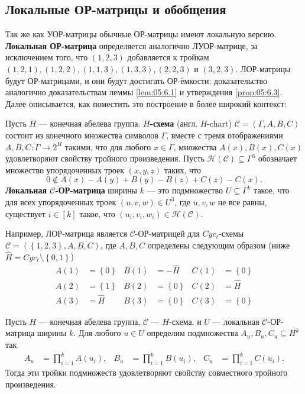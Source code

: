 \subsection{Локальные ОР-матрицы и обобщения}\label{ssub:05:6.3}

Так же как УОР-матрицы обычные ОР-матрицы имеют локальную версию. \textbf{Локальная ОР-матрица} определяется аналогично ЛУОР-матрице, за исключением того, что $(1,2,3)$ добавляется к тройкам $(1,2,1), (1,2,2), (1,1,3), (1,3,3), (2,2,3)$ и $(3,2,3)$. ЛОР-матрицы будут ОР-матрицами, и они будут достигать ОР-ёмкости: доказательство аналогично доказательствам леммы \ref{lem:05:6.1} и утверждения \ref{prop:05:6.3}. Далее описывается, как поместить это построение в более широкий контекст:

\begin{definition}
  \label{def:05:6.5} Пусть $H$ --- конечная абелева группа. \textbf{$H$-схема} (англ. $H$-chart) $\mathcal{C}=(\Gamma, A,B,C)$ состоит из конечного множества символов $\Gamma$, вместе с тремя отображениями $A,B,C: \Gamma \to 2^H$ такими, что для любого $x \in \Gamma$, множества $A(x), B(x), C(x)$ удовлетворяют свойству тройного произведения. Пусть $\mathcal{H}(\mathcal{C}) \subseteq \Gamma^3$ обозначает множество упорядоченных троек $(x,y,z)$ таких, что 
  \[
  	0 \notin A(x) - A(y) + B(y) - B(z) + C(z) - C(x).
  \]
\textbf{Локальная $\mathcal{C}$-ОР-матрица} ширины $k$ --- это подмножество $U \subseteq \Gamma^k$ такое, что для всех упорядоченных троек $(u,v,w) \in U^3$, где $u,v,w$ не все равны, существует $i \in [k]$ такое, что $(u_i, v_i, w_i) \in \mathcal{H}(\mathcal{C})$.
\end{definition}

Например, ЛОР-матрица является $\mathcal{C}$-ОР-матрицей для $Cyc_\ell$-схемы $\mathcal{C}=(\left\{ 1,2,3 \right\}, A, B, C)$, где $A, B, C$ определены следующим образом (ниже $\widehat{H} = Cyc_\ell \setminus \left\{ 0,1 \right\}$)
\begin{align*}
  	A(1) & = \left\{ 0 \right\} & B(1) & = -\widehat{H} & C(1) & = \left\{ 0 \right\}\\
  	A(2) & = \left\{ 1 \right\} & B(2) & = \left\{ 0 \right\} & C(2) & = \widehat{H}\\
  	A(3) & = \widehat{H} & B(3) & = \left\{ 0 \right\} & C(3) & = \left\{ 0 \right\}
\end{align*}

\begin{theorem}
  \label{th:05:6.6} Пусть $H$ --- конечная абелева группа, $\mathcal{C}$ --- $H$-схема, и $U$ --- локальная $\mathcal{C}$-ОР-матрица ширины $k$. Для любого $u \in U$ определим подмножества $A_u, B_u, C_u \subseteq H^k$ так
  \begin{align*}
  	A_u & = \prod_{i=1}^k A(u_i), & B_u & = \prod_{i=1}^k B(u_i), & C_u & = \prod_{i=1}^k C(u_i).
  \end{align*}
  Тогда эти тройки подмножеств удовлетворяют свойству совместного тройного произведения.
\end{theorem}

